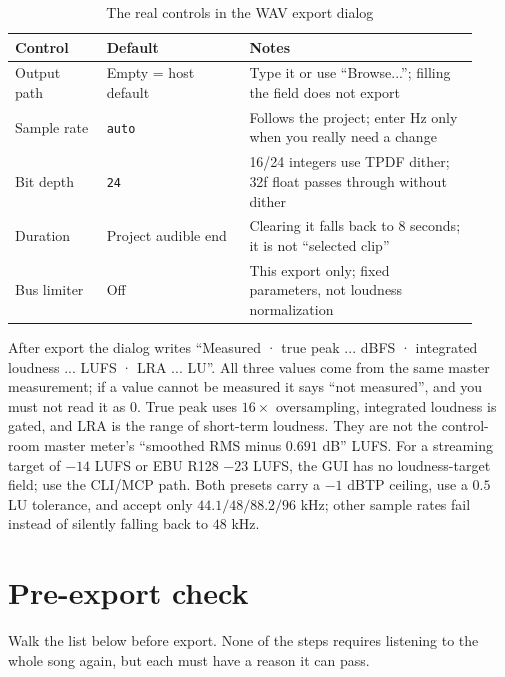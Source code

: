 \begin{table}[htbp]
\centering
\small
\begin{tabular}{@{}p{0.18\linewidth}p{0.29\linewidth}p{0.45\linewidth}@{}}
\hline
Control & Default & Notes \\
\hline
Output path & Empty = host default & Type it or use ``Browse...''; filling the field does not export \\
Sample rate & \texttt{auto} & Follows the project; enter Hz only when you really need a change \\
Bit depth & \texttt{24} & 16/24 integers use TPDF dither; 32f float passes through without dither \\
Duration & Project audible end & Clearing it falls back to 8 seconds; it is not ``selected clip'' \\
Bus limiter & Off & This export only; fixed parameters, not loudness normalization \\
\hline
\end{tabular}
\caption{The real controls in the WAV export dialog}
\label{tab:walk-export-controls}
\end{table}


After export the dialog writes ``Measured · true peak ... dBFS · integrated loudness ... LUFS · LRA ... LU''. All three values come from the same master measurement; if a value cannot be measured it says ``not measured'', and you must not read it as $0$. True peak uses $16\times$ oversampling, integrated loudness is gated, and LRA is the range of short-term loudness. They are not the control-room master meter's ``smoothed RMS minus $0.691$ dB'' LUFS. For a streaming target of $-14$ LUFS or EBU R128 $-23$ LUFS, the GUI has no loudness-target field; use the CLI/MCP path. Both presets carry a $-1$ dBTP ceiling, use a $0.5$ LU tolerance, and accept only $44.1/48/88.2/96$ kHz; other sample rates fail instead of silently falling back to $48$ kHz.

\section{Pre-export check}

Walk the list below before export. None of the steps requires listening to the whole song again, but each must have a reason it can pass.

